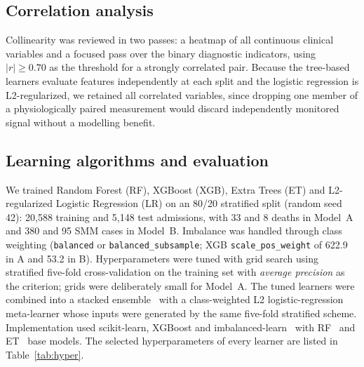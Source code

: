 \documentclass[healthcare,article,submit,pdftex,moreauthors]{Definitions/mdpi}
\begin{document}
\subsection{Correlation analysis}
Collinearity was reviewed in two passes: a heatmap of all continuous clinical variables
and a focused pass over the binary diagnostic indicators, using $|r|\geq 0.70$ as the
threshold for a strongly correlated pair. Because the tree-based learners evaluate
features independently at each split and the logistic regression is L2-regularized, we
retained all correlated variables, since dropping one member of a physiologically
paired measurement would discard independently monitored signal without a modelling
benefit.

\subsection{Learning algorithms and evaluation}
We trained Random Forest (RF), XGBoost (XGB), Extra Trees (ET) and L2-regularized
Logistic Regression (LR) on an 80/20 stratified split (random seed 42):
20{,}588 training and 5{,}148 test admissions, with 33 and 8 deaths in Model~A and
380 and 95 SMM cases in Model~B. Imbalance was handled through class weighting
(\texttt{balanced} or \texttt{balanced\_subsample}; XGB \texttt{scale\_pos\_weight}
of 622.9 in A and 53.2 in B). Hyperparameters were tuned with grid search using
stratified five-fold cross-validation on the training set with \emph{average
precision} as the criterion; grids were deliberately small for Model~A. The tuned
learners were combined into a stacked ensemble~\cite{Wolpert1992Stacking} with a
class-weighted L2 logistic-regression meta-learner whose inputs were generated by
the same five-fold stratified scheme. Implementation used scikit-learn,
XGBoost and imbalanced-learn~\cite{Pedregosa2011sklearn,Chen2016XGBoost,Chawla2002SMOTE}
with RF~\cite{Breiman2001RF} and ET~\cite{Geurts2006ExtraTrees} base models. The selected hyperparameters of every learner are listed in Table~\ref{tab:hyper}.
\end{document}

